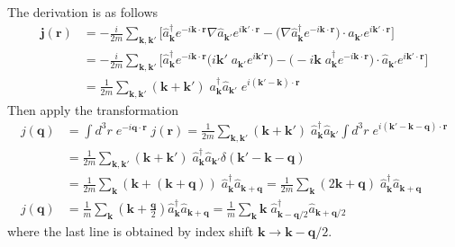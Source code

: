 \documentclass[../../../main.tex]{subfiles}
\begin{document}
The derivation is as follows
\begin{align*}
  \mathbf{j}(\mathbf{r})
   & = -\frac{i}{2m}\sum_{\mathbf{k},\mathbf{k}'}\Big[ \hat{a}_\mathbf{k}^\dagger e^{-i\mathbf{k}\cdot\mathbf{r}}\nabla \hat{a}_{\mathbf{k}'} e^{i\mathbf{k}'\cdot\mathbf{r}}-\big(\nabla  \hat{a}_\mathbf{k}^\dagger e^{-i\mathbf{k}\cdot\mathbf{r}}\big)\cdot \hat{a}_{\mathbf{k}'}e^{i\mathbf{k}'\cdot\mathbf{r}}\Big] \\
   & = -\frac{i}{2m}\sum_{\mathbf{k},\mathbf{k}'}\Big[ \hat{a}_\mathbf{k}^\dagger e^{-i\mathbf{k}\cdot\mathbf{r}}\big(i\mathbf{k}'\;a_{\mathbf{k}'}e^{i\mathbf{k}'\mathbf{r}}\big)
  -\big(-i\mathbf{k}\;a_\mathbf{k}^\dagger e^{-i\mathbf{k}\cdot\mathbf{r}}\big)\cdot \hat{a}_{\mathbf{k}'}e^{i\mathbf{k}'\cdot\mathbf{r}}\Big]                                                                                                                                                                            \\
   & = \frac{1}{2m}\sum_{\mathbf{k},\mathbf{k}'}(\mathbf{k}+\mathbf{k}')\;a_\mathbf{k}^\dagger \hat{a}_{\mathbf{k}'}\;e^{i(\mathbf{k}'-\mathbf{k})\cdot\mathbf{r}}
\end{align*}
Then apply the transformation
\begin{align*}
  j(\mathbf{q}) & = \int d^3r\; e^{-i\mathbf{q}\cdot\mathbf{r}}\; j(\mathbf{r})
  = \frac{1}{2m}\sum_{\mathbf{k},\mathbf{k}'} (\mathbf{k}+\mathbf{k}')\; \hat{a}_{\mathbf{k}}^\dagger \hat{a}_{\mathbf{k}'} \int d^3r\; e^{i(\mathbf{k}'-\mathbf{k}-\mathbf{q})\cdot\mathbf{r}} \\
                & =  \frac{1}{2m}\sum_{\mathbf{k},\mathbf{k}'} (\mathbf{k}+\mathbf{k}')\; \hat{a}_{\mathbf{k}}^\dagger \hat{a}_{\mathbf{k}'} \delta(\mathbf{k}'-\mathbf{k }-\mathbf{q})         \\
                & = \frac{1}{2m}\sum_{\mathbf{k}} (\mathbf{k}+(\mathbf{k}+\mathbf{q}))\; \hat{a}_{\mathbf{k}}^\dagger \hat{a}_{\mathbf{k}+\mathbf{q}}
  = \frac{1}{2m}\sum_{\mathbf{k}} (2\mathbf{k}+\mathbf{q})\; \hat{a}_{\mathbf{k}}^\dagger \hat{a}_{\mathbf{k}+\mathbf{q}}                                                                       \\
  j(\mathbf{q})
                & = \frac{1}{m}\sum_{\mathbf{k}} \left( \mathbf{k}+\frac{\mathbf{q } }{2} \right)  \hat{a}_{\mathbf{k}}^\dagger \hat{a}_{\mathbf{k}+\mathbf{q}}
  = \frac{1}{m}\sum_{\mathbf{k}} \mathbf{k}\; \hat{a}_{\mathbf{k}-\mathbf{q}/2}^\dagger \hat{a}_{\mathbf{k}+\mathbf{q}/2}
\end{align*}
where the last line is obtained by index shift $\mathbf{k}\rightarrow \mathbf{k}-\mathbf{q}/2$.
\end{document}

